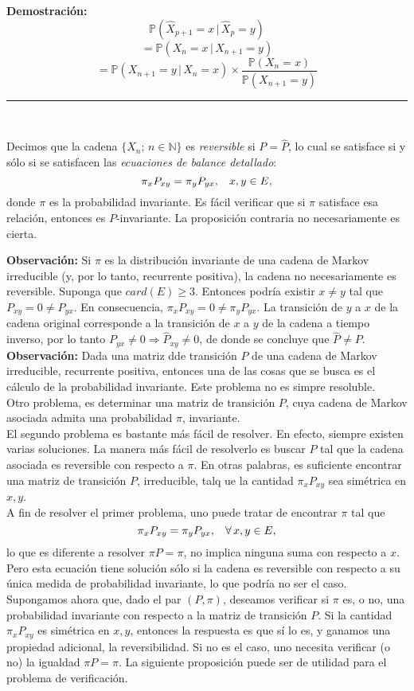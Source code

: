 \documentclass[a4paper]{article}
\newcommand{\prob}{\mathbb{P}}
\numberwithin{equation}{subsection}
\def\N{\mathbb N}
\begin{document}
\textbf{Demostración: }
\[\prob(\hat{X}_{p+1} = x\,|\,\hat{X}_p = y)\]
\[= \prob(X_n =x\,|\,X_{n+1}=y)\]
\[= \prob(X_{n+1} = y\,|\,X_n=x)\times \frac{\prob(X_n=x)}{\prob(X_{n+1}=y)}\]
\rule{0.7em}{0.7em}\\ \newline

Decimos que la cadena $\{X_n;\,n\in\N\}$ es \textit{reversible} si $P=\hat{P}$, lo cual se satisface si y sólo si se satisfacen las \textit{ecuaciones de balance detallado}:
\[\pi_x P_{xy} = \pi_y P_{yx},\hspace{0.3cm}x,y\in E,\]
donde $\pi$ es la probabilidad invariante. Es fácil verificar que si $\pi$ satisface esa relación, entonces es $P$-invariante. La proposición contraria no necesariamente es cierta.\\ \newline
 
\textbf{Observación: }Si $\pi$ es la distribución invariante de una cadena de Markov irreducible (y, por lo tanto, recurrente positiva), la cadena no necesariamente es reversible. Suponga que $card(E)\geq 3$. Entonces podría existir $x\neq y$ tal que $P_{xy}=0\neq P_{yx}$. En consecuencia, $\pi_xP_{xy}=0\neq \pi_yP_{yx}$. La transición de $y$ a $x$ de la cadena original corresponde a la transición de $x$ a $y$ de la cadena a tiempo inverso, por lo tanto $P_{yx}\neq 0 \Longrightarrow \hat{P}_{xy} \neq 0$, de donde se concluye que $\hat{P}\neq P$.\\

\textbf{Observación: }Dada una matriz dde transición $P$ de una cadena de Markov irreducible, recurrente positiva, entonces una de las cosas que se busca es el cálculo de la probabilidad invariante. Este problema no es simpre resoluble.\\ 
Otro problema, es determinar una matriz de transición $P$, cuya cadena de Markov asociada admita una probabilidad $\pi$, invariante.\\ 
El segundo problema es bastante más fácil de resolver. En efecto, siempre existen varias soluciones. La manera más fácil de resolverlo es buscar $P$ tal que la cadena asociada es reversible con respecto a $\pi$. En otras palabras, es suficiente encontrar una matriz de transición $P$, irreducible, talq ue la cantidad $\pi_x P_{xy}$ sea simétrica en $x,y$.\\
A fin de resolver el primer problema, uno puede tratar de encontrar $\pi$ tal que
\[\pi_x P_{xy} = \pi_y P_{yx},\hspace{0.3cm}\forall\,x,y\in E,\]
lo que es diferente a resolver $\pi P= \pi$, no implica ninguna suma con respecto a $x$. Pero esta ecuación tiene solución sólo si la cadena es reversible con respecto a su única medida de probabilidad invariante, lo que podría no ser el caso.\\
Supongamos ahora que, dado el par $(P,\pi)$, deseamos verificar si $\pi$ es, o no, una probabilidad invariante con respecto a la matriz de transición $P$. Si la cantidad $\pi_x P_{xy}$ es simétrica en $x,y$, entonces la respuesta es que sí lo es, y ganamos una propiedad adicional, la reversibilidad. Si no es el caso, uno necesita verificar (o no) la igualdad $\pi P = \pi$. La siguiente proposición puede ser de utilidad para el problema de verificación.
\end{document}
